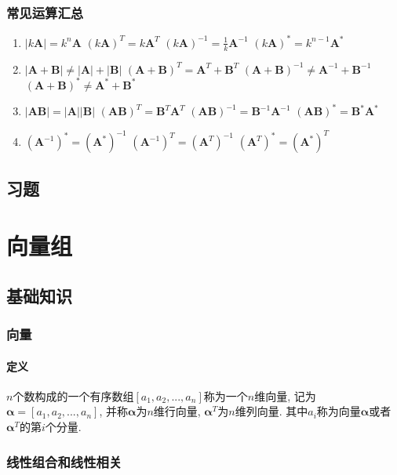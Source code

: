 \subsection{常见运算汇总}
\begin{enumerate}
\item 
\subitem $ |k\bm{A}|=k^{n}\bm{A} $
\subitem $ (k\bm{A})^{T}=k\bm{A}^{T} $
\subitem $ (k\bm{A})^{-1}=\frac{1}{k}\bm{A}^{-1} $
\subitem $ (k\bm{A})^{*}=k^{n-1}\bm{A}^{*} $
\item 
\subitem $ |\bm{A}+\bm{B}|\neq |\bm{A}|+|\bm{B}| $
\subitem $ (\bm{A}+\bm{B})^{T}=\bm{A}^{T}+\bm{B}^{T} $
\subitem $ (\bm{A}+\bm{B})^{-1}\neq \bm{A}^{-1}+\bm{B}^{-1} $
\subitem $ (\bm{A}+\bm{B})^{*}\neq \bm{A}^{*}+\bm{B}^{*} $
\item 
\subitem $ |\bm{A}\bm{B}|=|\bm{A}||\bm{B}| $
\subitem $ (\bm{A}\bm{B})^{T}=\bm{B}^{T}\bm{A}^{T} $
\subitem $ (\bm{A}\bm{B})^{-1}=\bm{B}^{-1}\bm{A}^{-1} $
\subitem $ (\bm{A}\bm{B})^{*}=\bm{B}^{*}\bm{A}^{*} $
\item 
\subitem $ (\bm{A}^{-1})^{*}=(\bm{A}^{*})^{-1} $
\subitem $ (\bm{A}^{-1})^{T}=(\bm{A}^{T})^{-1} $
\subitem $ (\bm{A}^{T})^{*}=(\bm{A}^{*})^{T} $
\end{enumerate}
\section{习题}
\chapter{向量组}
\section{基础知识}
\subsection{向量}
\subsubsection{定义}
$ n $个数构成的一个有序数组$ [a_{1},a_{2},...,a_{n}] $称为一个$ n $维向量, 记为$ \bm{\alpha} = [a_{1},a_{2},...,a_{n}] $, 并称$ \bm{\alpha} $为$ n $维行向量, $ \bm{\alpha}^{T} $为$ n $维列向量. 其中$ a_{i} $称为向量$ \bm{\alpha} $或者$ \bm{\alpha}^{T} $的第$ i $个分量.
\subsection{线性组合和线性相关}
